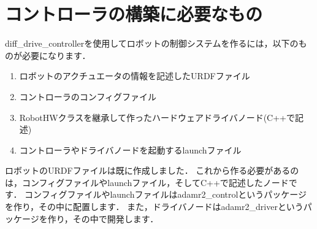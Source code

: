 \documentclass[{../../master}]{subfiles}
\begin{document}
\section{コントローラの構築に必要なもの}

\textsf{diff\_drive\_controller}を使用してロボットの制御システムを作るには，以下のものが必要になります．

\begin{enumerate}
  \item ロボットのアクチュエータの情報を記述したURDFファイル
  \item コントローラのコンフィグファイル
  \item RobotHWクラスを継承して作ったハードウェアドライバノード(C++で記述)
  \item コントローラやドライバノードを起動するlaunchファイル
\end{enumerate}

ロボットのURDFファイルは既に作成しました．
これから作る必要があるのは，コンフィグファイルやlaunchファイル，そしてC++で記述したノードです．
コンフィグファイルやlaunchファイルは\textsf{adamr2\_control}というパッケージを作り，その中に配置します．
また，ドライバノードは\textsf{adamr2\_driver}というパッケージを作り，その中で開発します．
\end{document}
